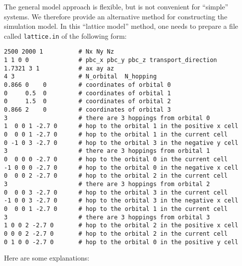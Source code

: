 \documentclass[12pt,a4paper]{report}
\begin{document}
The general model approach is flexible, but is not convenient for ``simple'' systems. We therefore provide an alternative method for constructing the simulation model. In this ``lattice model'' method, one needs to prepare a file called \verb"lattice.in" of the following form:
\begin{verbatim}
2500 2000 1          # Nx Ny Nz
1 1 0 0              # pbc_x pbc_y pbc_z transport_direction
1.7321 3 1           # ax ay az
4 3                  # N_orbital  N_hopping
0.866 0    0         # coordinates of orbital 0
0     0.5  0         # coordinates of orbital 1
0     1.5  0         # coordinates of orbital 2
0.866 2    0         # coordinates of orbital 3
3                    # there are 3 hoppings from orbital 0
1  0 0 1 -2.7 0      # hop to the orbital 1 in the positive x cell
0  0 0 1 -2.7 0      # hop to the orbital 1 in the current cell
0 -1 0 3 -2.7 0      # hop to the orbital 3 in the negative y cell
3                    # there are 3 hoppings from orbital 1
0  0 0 0 -2.7 0      # hop to the orbital 0 in the current cell
-1 0 0 0 -2.7 0      # hop to the orbital 0 in the negative x cell
0  0 0 2 -2.7 0      # hop to the orbital 2 in the current cell
3                    # there are 3 hoppings from orbital 2
0  0 0 3 -2.7 0      # hop to the orbital 3 in the current cell
-1 0 0 3 -2.7 0      # hop to the orbital 3 in the negative x cell
0  0 0 1 -2.7 0      # hop to the orbital 1 in the current cell
3                    # there are 3 hoppings from orbital 3
1 0 0 2 -2.7 0       # hop to the orbital 2 in the positive x cell
0 0 0 2 -2.7 0       # hop to the orbital 2 in the current cell
0 1 0 0 -2.7 0       # hop to the orbital 0 in the positive y cell
\end{verbatim}
Here are some explanations:
\end{document}
